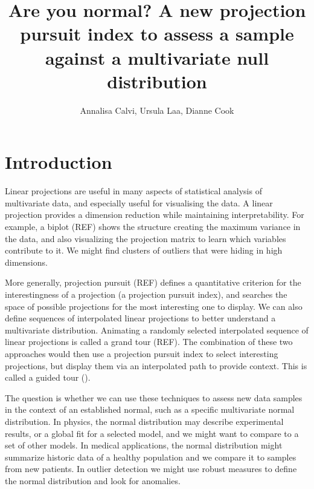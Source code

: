 \documentclass[
  12pt]{article}
\begin{document}
\def\spacingset#1{\renewcommand{\baselinestretch}%
{#1}\small\normalsize} \spacingset{1}



\title{\bf Are you normal? A new projection pursuit index to assess a
sample against a multivariate null distribution}
\author{
Annalisa Calvi, Ursula Laa, Dianne Cook\\
}
\maketitle

\bigskip
\bigskip
\begin{abstract}

\end{abstract}


\newpage
\spacingset{1.9} %

\section{Introduction}\label{introduction}

Linear projections are useful in many aspects of statistical analysis of
multivariate data, and especially useful for visualising the data. A
linear projection provides a dimension reduction while maintaining
interpretability. For example, a biplot (REF) shows the structure
creating the maximum variance in the data, and also visualizing the
projection matrix to learn which variables contribute to it. We might
find clusters of outliers that were hiding in high dimensions.

More generally, projection pursuit (REF) defines a quantitative
criterion for the interestingness of a projection (a projection pursuit
index), and searches the space of possible projections for the most
interesting one to display. We can also define sequences of interpolated
linear projections to better understand a multivariate distribution.
Animating a randomly selected interpolated sequence of linear
projections is called a grand tour (REF). The combination of these two
approaches would then use a projection pursuit index to select
interesting projections, but display them via an interpolated path to
provide context. This is called a guided tour (\citet{cook1995}).

The question is whether we can use these techniques to assess new data
samples in the context of an established normal, such as a specific
multivariate normal distribution. In physics, the normal distribution
may describe experimental results, or a global fit for a selected model,
and we might want to compare to a set of other models. In medical
applications, the normal distribution might summarize historic data of a
healthy population and we compare it to samples from new patients. In
outlier detection we might use robust measures to define the normal
distribution and look for anomalies.
\end{document}
